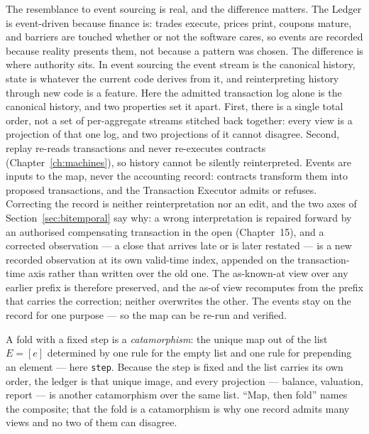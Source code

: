 The resemblance to event sourcing is real, and the difference matters. The Ledger is
event-driven because finance is: trades execute, prices print, coupons mature, and
barriers are touched whether or not the software cares, so events are recorded because
reality presents them, not because a pattern was chosen. The difference is where authority
sits. In event sourcing the event stream is the canonical history, state is whatever the
current code derives from it, and reinterpreting history through new code is a feature.
Here the admitted transaction log alone is the canonical history, and two properties set it
apart. First, there is a single total order, not a set of per-aggregate streams stitched
back together: every view is a projection of that one log, and two projections of it cannot
disagree. Second, replay re-reads transactions and never re-executes contracts
(Chapter~\ref{ch:machines}), so history cannot be silently reinterpreted. Events are inputs
to the map, never the accounting record: contracts transform them into proposed
transactions, and the Transaction Executor admits or refuses. Correcting the record is
neither reinterpretation nor an edit, and the two axes of Section~\ref{sec:bitemporal} say
why: a wrong interpretation is repaired forward by an authorised compensating transaction in the open
(Chapter~15), and a corrected observation --- a close that arrives late or is later restated
--- is a new recorded observation at its own valid-time index, appended on the
transaction-time axis rather than written over the old one. The as-known-at view over any
earlier prefix is therefore preserved, and the as-of view recomputes from the prefix that
carries the correction; neither overwrites the other. The events stay on the record for one
purpose --- so the map can be re-run and verified.

\begin{secondtelling}
A fold with a fixed step is a \emph{catamorphism}: the unique map out of the list $E=[e]$
determined by one rule for the empty list and one rule for prepending an element --- here
\texttt{step}. Because the step is fixed and the list carries its own order, the ledger is
that unique image, and every projection --- balance, valuation, report --- is another
catamorphism over the same list. ``Map, then fold'' names the composite; that the fold is
a catamorphism is why one record admits many views and no two of them can disagree.
\end{secondtelling}
